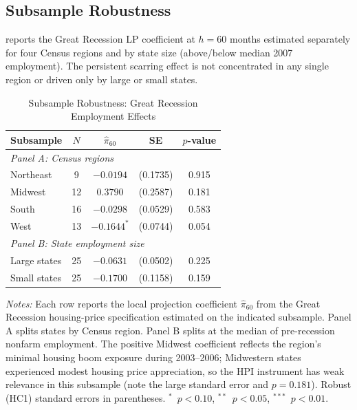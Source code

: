 \documentclass[12pt]{article}
\begin{document}
\subsection{Subsample Robustness}

 reports the Great Recession LP coefficient at $h = 60$ months estimated separately for four Census regions and by state size (above/below median 2007 employment). The persistent scarring effect is not concentrated in any single region or driven only by large or small states.

\begin{table}[H]
\centering
\caption{Subsample Robustness: Great Recession Employment Effects}
\begin{threeparttable}
\small
\begin{tabular}{lcccc}
\toprule
Subsample & $N$ & $\hat{\pi}_{60}$ & SE & $p$-value \\
\midrule
\multicolumn{5}{l}{\textit{Panel A: Census regions}} \\[3pt]
Northeast & 9 & $-0.0194$ & (0.1735) & 0.915 \\
Midwest & 12 & $0.3790$ & (0.2587) & 0.181 \\
South & 16 & $-0.0298$ & (0.0529) & 0.583 \\
West & 13 & $-0.1644^{*}$ & (0.0744) & 0.054 \\
\midrule
\multicolumn{5}{l}{\textit{Panel B: State employment size}} \\[3pt]
Large states & 25 & $-0.0631$ & (0.0502) & 0.225 \\
Small states & 25 & $-0.1700$ & (0.1158) & 0.159 \\
\bottomrule
\end{tabular}
\begin{tablenotes}[flushleft]
\small
\item \textit{Notes:} Each row reports the local projection coefficient $\hat{\pi}_{60}$ from the Great Recession housing-price specification estimated on the indicated subsample. Panel A splits states by Census region. Panel B splits at the median of pre-recession nonfarm employment. The positive Midwest coefficient reflects the region's minimal housing boom exposure during 2003--2006; Midwestern states experienced modest housing price appreciation, so the HPI instrument has weak relevance in this subsample (note the large standard error and $p = 0.181$). Robust (HC1) standard errors in parentheses. $^{*}$~$p<0.10$, $^{**}$~$p<0.05$, $^{***}$~$p<0.01$.
\end{tablenotes}
\end{threeparttable}
\label{tab:subsample}
\end{table}
\end{document}
